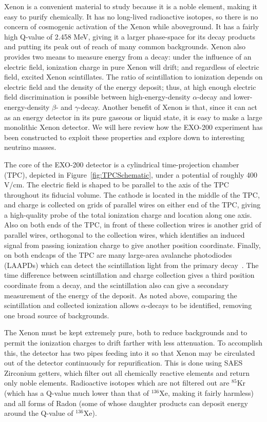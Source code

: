 Xenon is a convenient material to study because it is a noble element, making it easy to purify chemically.  It has no long-lived radioactive isotopes, so there is no concern of cosmogenic activation of the Xenon while aboveground.  It has a fairly high Q-value of 2.458 MeV, giving it a larger phase-space for its decay products and putting its peak out of reach of many common backgrounds.  Xenon also provides two means to measure energy from a decay:  under the influence of an electric field, ionization charge in pure Xenon will drift; and regardless of electric field, excited Xenon scintillates.  The ratio of scintillation to ionization depends on electric field and the density of the energy deposit; thus, at high enough electric field discrimination is possible between high-energy-density $\alpha$-decay and lower-energy-density $\beta$- and $\gamma$-decay.  Another benefit of Xenon is that, since it can act as an energy detector in its pure gaseous or liquid state, it is easy to make a large monolithic Xenon detector.  We will here review how the EXO-200 experiment has been constructed to exploit these properties and explore down to interesting neutrino masses.



The core of the EXO-200 detector is a cylindrical time-projection chamber (TPC), depicted in Figure~\ref{fig:TPCSchematic}, under a potential of roughly 400 V/cm.  The electric field is shaped to be parallel to the axis of the TPC throughout its fiducial volume.  The cathode is located in the middle of the TPC, and charge is collected on grids of parallel wires on either end of the TPC, giving a high-quality probe of the total ionization charge and location along one axis.  Also on both ends of the TPC, in front of these collection wires is another grid of parallel wires, orthogonal to the collection wires, which identifies an induced signal from passing ionization charge to give another position coordinate.  Finally, on both endcaps of the TPC are many large-area avalanche photodiodes (LAAPDs) which can detect the scintillation light from the primary decay~\cite{EXOLAAPD}.  The time difference between scintillation and charge collection gives a third position coordinate from a decay, and the scintillation also can give a secondary measurement of the energy of the deposit.  As noted above, comparing the scintillation and collected ionization allows $\alpha$-decays to be identified, removing one broad source of backgrounds.

The Xenon must be kept extremely pure, both to reduce backgrounds and to permit the ionization charges to drift farther with less attenuation.  To accomplish this, the detector has two pipes feeding into it so that Xenon may be circulated out of the detector continuously for repurification.  This is done using SAES Zirconium getters, which filter out all chemically reactive elements and return only noble elements.  Radioactive isotopes which are not filtered out are $^{85}$Kr (which has a Q-value much lower than that of $^{136}$Xe, making it fairly harmless) and all forms of Radon (some of whose daughter products can deposit energy around the Q-value of $^{136}$Xe).

